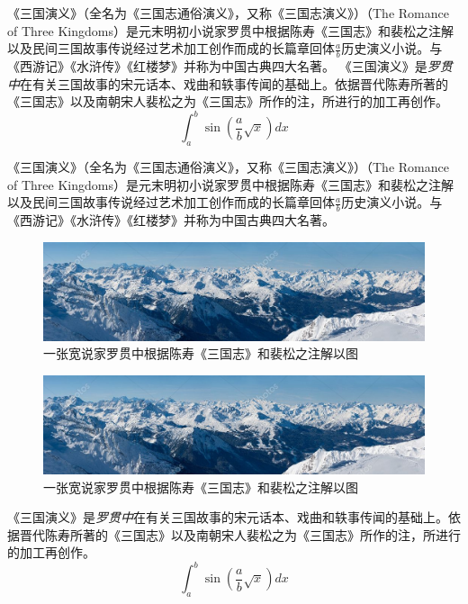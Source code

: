 《三国演义》（全名为《三国志通俗演义》，又称《三国志演义》）（The Romance of Three Kingdoms）是元末明初小说家罗贯中根据陈寿\cite{ausubel1991}《三国志》和裴松之注解以及民间三国故事传说经过艺术加工创作而成的长篇章回体$\frac{a}{b}$历史演义小说。与《西游记》《水浒传》《红楼梦》并称为中国古典四大名著。
《三国演义》是\emph{罗贯中}在有关{\sffamily 三国故事的宋元话本}、戏曲和轶事传闻的基础上。依据晋代陈寿所著的《三国志》以及南朝宋人裴松之为《三国志》所作的注，所进行的加工再创作。
\begin{equation}
    \int_a^b\sin(\frac{a}{b}\sqrt{x})dx
\end{equation}

《三国演义》（全名为《三国志通俗演义》，又称《三国志演义》）（The Romance of Three Kingdoms）是元末明初小说家罗贯中根据陈寿《三国志》和裴松之注解以及民间三国故事传说经过艺术加工创作而成的长篇章回体$\frac{a}{b}$历史演义小说。与《西游记》《水浒传》《红楼梦》并称为中国古典四大名著。
\begin{figure}
    \includegraphics[width=\linewidth]{images/wide.jpeg}
    \caption{一张宽说家罗贯中根据陈寿《三国志》和裴松之注解以图}
\end{figure}
\begin{figure}
    \includegraphics[width=\linewidth]{images/wide.jpeg}
    \caption{一张宽说家罗贯中根据陈寿《三国志》和裴松之注解以图}
\end{figure}
《三国演义》是\emph{罗贯中}在有关{\sffamily 三国故事的宋元话本}、戏曲和轶事传闻的基础上。依据晋代陈寿所著的《三国志》以及南朝宋人裴松之为《三国志》所作的注，所进行的加工再创作。
\begin{equation}
    \int_a^b\sin(\frac{a}{b}\sqrt{x})dx
\end{equation}

